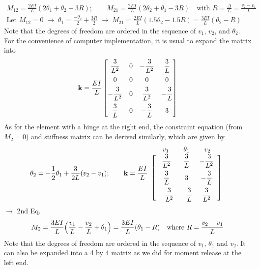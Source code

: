 \begin{gather*}
  M_{12} = \frac{2EI}{L}(2\theta_1 + \theta_2 - 3R);\qquad M_{21} = \frac{2EI}{L}(2\theta_2 + \theta_1 - 3R)\quad\text{with } R = \frac{\Delta}{L} = \frac{v_2-v_1}{L}\\
  \text{Let } M_{12} = 0 \;\rightarrow\; \theta_1 = \frac{-\theta_2}{2} + \frac{3R}{2} \;\rightarrow\; M_{21} = \frac{2EI}{L}(1.5\theta_2 - 1.5R) = \frac{3EI}{L}(\theta_2 - R)
\end{gather*}
Note that the degrees of freedom are ordered in the sequence of $v_1$, $v_2$, and $\theta_2$. For the convenience of computer implementation, it is usual to expand the matrix into
\begin{equation}
  \mathbf{k} = \frac{EI}{L}
  \begin{bmatrix}
    \dfrac{3}{L^2} & 0 & -\dfrac{3}{L^2} & \dfrac3L\\[8pt]
    0 & 0 & 0 & 0\\[4pt]
    -\dfrac{3}{L^2} & 0 & \dfrac{3}{L^2} & -\dfrac3L\\[8pt]
    \dfrac3L & 0 & -\dfrac3L & 3
  \end{bmatrix}
\end{equation}
As for the element with a hinge at the right end, the constraint equation (from $M_2 = 0$) and stiffness matrix can be derived similarly, which are given by
\begin{equation}
  \theta_2 = -\frac12\theta_1 + \frac{3}{2L}(v_2 - v_1);\qquad
  \mathbf{k} = \frac{EI}{L}
  \begin{array}{c}
    \begin{array}{ccc} \;\;v_1\;\; & \;\;\theta_1\;\; & \;\;v_2\;\; \end{array}\\
    \left[\begin{array}{ccc}
      \dfrac{3}{L^2} & \dfrac3L & -\dfrac{3}{L^2}\\[8pt]
      \dfrac3L & 3 & -\dfrac3L\\[8pt]
      -\dfrac{3}{L^2} & -\dfrac3L & \dfrac{3}{L^2}
    \end{array}\right]
  \end{array}
\end{equation}
$\rightarrow$ 2nd Eq.
\begin{equation*}
  M_2 = \frac{3EI}{L}\Bigl(\frac{v_1}{L} - \frac{v_2}{L} + \theta_1\Bigr) = \frac{3EI}{L}(\theta_1 - R)\quad\text{where } R = \frac{v_2-v_1}{L}
\end{equation*}
Note that the degrees of freedom are ordered in the sequence of $v_1$, $\theta_1$ and $v_2$. It can also be expanded into a 4 by 4 matrix as we did for moment release at the left end.

